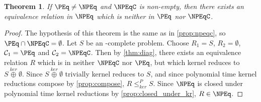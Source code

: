 \documentclass[draft]{article}
\newtheorem{theorem}{Theorem}[section]
\theoremstyle{definition} \newtheorem{openproblem}[openproblem]{Open problem}
\theoremstyle{definition} \newtheorem{definition}[definition]{Definition}
\theoremstyle{remark} \newtheorem{remark}[remark]{Remark}
\newcommand{\kj}{\overset{ker}{\oplus}} %
\newcommand{\kr}{\leq^{P}_{ker}} %
\newcommand{\printintermediarytheorem}{If $\PEq\neq\NPEq$ and $\NPEqC$ is non-empty, then there exists an equivalence relation in $\NPEq$ which is neither in $\PEq$ nor $\NPEqC$.}
\begin{document}
\begin{theorem}\label{thm:intermediary}
  \printintermediarytheorem
\end{theorem}
\begin{proof}
  The hypothesis of this theorem is the same as in \autoref{prop:npeqc}, so $\PEq\cap\NPEqC=\emptyset$.
  Let $S$ be an \NPEq-complete problem.
  Choose $R_1=S$, $R_2=\emptyset$, $\mathcal{C}_1=\PEq$ and $\mathcal{C}_2=\NPEqC$.
  Then by \autoref{thm:diag}, there exists an equivalence relation $R$ which is in neither $\NPEqC$ nor $\PEq$, but which kernel reduces to $S\kj\emptyset$.
  Since $S\kj\emptyset$ trivially kernel reduces to $S$, and since polynomial time kernel reductions compose by \autoref{prop:compose}, $R\kr S$.
  Since $\NPEq$ is closed under polynomial time kernel reductions by \autoref{prop:closed_under_kr}, $R\in\NPEq$.
\end{proof}



\end{document}
